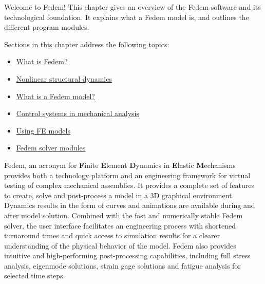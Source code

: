 %
%

%
%


Welcome to Fedem! This chapter gives an overview of the Fedem software and its
technological foundation. It explains what a Fedem model is, and outlines the
different program modules.

Sections in this chapter address the following topics:

\begin{itemize}
\item
  \protect\hyperlink{what-is-fedem}
                    {What is Fedem?}
\item
  \protect\hyperlink{nonlinear-structural-dynamics}
                    {Nonlinear structural dynamics}
\item
  \protect\hyperlink{what-is-a-fedem-model}
                    {What is a Fedem model?}
\item
  \protect\hyperlink{control-systems-in-mechanical-analysis}
                    {Control systems in mechanical analysis}
\item
  \protect\hyperlink{using-fe-models}
                    {Using FE models}
\item
  \protect\hyperlink{fedem-solver-modules}
                    {Fedem solver modules}
\end{itemize}

\clearpage



Fedem, an acronym for \textbf{F}inite \textbf{E}lement \textbf{D}ynamics
in \textbf{E}lastic \textbf{M}echanisms provides both a technology
platform and an engineering framework for
virtual testing of complex mechanical assemblies. It provides a
complete set of features to create, solve and post-process a model
in a 3D graphical environment. Dynamics results in the form of
curves and animations are available during and after model solution.
Combined with the fast and numerically stable Fedem solver,
the user interface facilitates an engineering process with
shortened turnaround times and quick access to simulation results
for a clearer understanding of the physical behavior of the model.
Fedem also provides intuitive and high-performing post-processing
capabilities, including full stress analysis, eigenmode solutions,
strain gage solutions and fatigue analysis for selected time steps.

